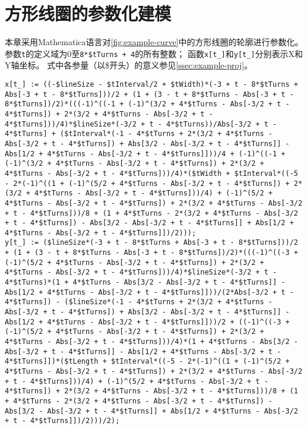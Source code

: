 \documentclass[index]{subfiles}
\begin{document}
\chapter{方形线圈的参数化建模}\label{sec:tricks}
本章采用Mathematica语言对\cref{fig:example-curve}中的方形线圈的轮廓进行参数化。
参数\lstinline"t"的定义域为0至\lstinline"8*$tTurns + 4"的所有整数；
函数\lstinline"x[t_]"和\lstinline"y[t_]"分别表示X和Y轴坐标。
式中各参量（以\$开头）的意义参见\cref{ssec:example-proj}。

\begin{lstlisting}[breaklines]
x[t_] := ((-$lineSize - $tInterval/2 + $tWidth)*(-3 + t - 8*$tTurns + Abs[-3 + t - 8*$tTurns]))/2 + (1 + (3 - t + 8*$tTurns - Abs[-3 + t - 8*$tTurns])/2)*(((-1)^((-1 + (-1)^(3/2 + 4*$tTurns - Abs[-3/2 + t - 4*$tTurns]) + 2*(3/2 + 4*$tTurns - Abs[-3/2 + t - 4*$tTurns]))/4)*$lineSize*(-3/2 + t - 4*$tTurns))/Abs[-3/2 + t - 4*$tTurns] + ($tInterval*(-1 - 4*$tTurns + 2*(3/2 + 4*$tTurns - Abs[-3/2 + t - 4*$tTurns]) + Abs[3/2 - Abs[-3/2 + t - 4*$tTurns]] - Abs[1/2 + 4*$tTurns - Abs[-3/2 + t - 4*$tTurns]]))/4 + (-1)^((-1 + (-1)^(3/2 + 4*$tTurns - Abs[-3/2 + t - 4*$tTurns]) + 2*(3/2 + 4*$tTurns - Abs[-3/2 + t - 4*$tTurns]))/4)*($tWidth + $tInterval*((-5 - 2*(-1)^((1 + (-1)^(5/2 + 4*$tTurns - Abs[-3/2 + t - 4*$tTurns]) + 2*(3/2 + 4*$tTurns - Abs[-3/2 + t - 4*$tTurns]))/4) + (-1)^(5/2 + 4*$tTurns - Abs[-3/2 + t - 4*$tTurns]) + 2*(3/2 + 4*$tTurns - Abs[-3/2 + t - 4*$tTurns]))/8 + (1 + 4*$tTurns - 2*(3/2 + 4*$tTurns - Abs[-3/2 + t - 4*$tTurns]) - Abs[3/2 - Abs[-3/2 + t - 4*$tTurns]] + Abs[1/2 + 4*$tTurns - Abs[-3/2 + t - 4*$tTurns]])/2)));
y[t_] := ($lineSize*(-3 + t - 8*$tTurns + Abs[-3 + t - 8*$tTurns]))/2 + (1 + (3 - t + 8*$tTurns - Abs[-3 + t - 8*$tTurns])/2)*(((-1)^((-3 + (-1)^(5/2 + 4*$tTurns - Abs[-3/2 + t - 4*$tTurns]) + 2*(3/2 + 4*$tTurns - Abs[-3/2 + t - 4*$tTurns]))/4)*$lineSize*(-3/2 + t - 4*$tTurns)*(1 + 4*$tTurns - Abs[3/2 - Abs[-3/2 + t - 4*$tTurns]] - Abs[1/2 + 4*$tTurns - Abs[-3/2 + t - 4*$tTurns]]))/(2*Abs[-3/2 + t - 4*$tTurns]) - ($lineSize*(-1 - 4*$tTurns + 2*(3/2 + 4*$tTurns - Abs[-3/2 + t - 4*$tTurns]) + Abs[3/2 - Abs[-3/2 + t - 4*$tTurns]] - Abs[1/2 + 4*$tTurns - Abs[-3/2 + t - 4*$tTurns]]))/2 + ((-1)^((-3 + (-1)^(5/2 + 4*$tTurns - Abs[-3/2 + t - 4*$tTurns]) + 2*(3/2 + 4*$tTurns - Abs[-3/2 + t - 4*$tTurns]))/4)*(1 + 4*$tTurns - Abs[3/2 - Abs[-3/2 + t - 4*$tTurns]] - Abs[1/2 + 4*$tTurns - Abs[-3/2 + t - 4*$tTurns]])*($tLength + $tInterval*((-5 - 2*(-1)^((1 + (-1)^(5/2 + 4*$tTurns - Abs[-3/2 + t - 4*$tTurns]) + 2*(3/2 + 4*$tTurns - Abs[-3/2 + t - 4*$tTurns]))/4) + (-1)^(5/2 + 4*$tTurns - Abs[-3/2 + t - 4*$tTurns]) + 2*(3/2 + 4*$tTurns - Abs[-3/2 + t - 4*$tTurns]))/8 + (1 + 4*$tTurns - 2*(3/2 + 4*$tTurns - Abs[-3/2 + t - 4*$tTurns]) - Abs[3/2 - Abs[-3/2 + t - 4*$tTurns]] + Abs[1/2 + 4*$tTurns - Abs[-3/2 + t - 4*$tTurns]])/2)))/2);
\end{lstlisting}
\end{document}
